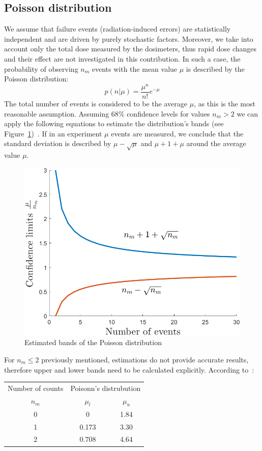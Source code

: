 \subsection{Poisson distribution}
We assume that failure events (radiation-induced errors) are statistically independent and are driven by purely stochastic factors. Moreover, we take into account only the total dose measured by the dosimeters, thus rapid dose changes and their effect are not investigated in this contribution. In such a case, the probability of observing $n_{m}$ events with the mean value $\mu$ is described by the Poisson distribution:\newline
\begin{equation}
    p(n|\mu) = \frac{\mu^{n}}{n!}e^{-\mu}
\end{equation}
The total number of events is considered to be the average $\mu$, as this is the most reasonable assumption.
Assuming 68\% confidence levels for values $n_{m} > 2$ we can apply the following equations to estimate the distribution's bands (see Figure~\ref{fig:poisson})~\cite{schmidt}.
If in an experiment $\mu$ events are measured, we conclude that the standard deviation is described by $\mu - \sqrt{\mu}$ and $\mu + 1 + \mu$ around the average value $\mu$.
\begin{figure}[!h]
    \centering
    \includegraphics[width=0.55\columnwidth]{Chapter4/images/poisson.png}
    \caption{Estimated bands of the Poisson distribution~\cite{schmidt}}
    \label{fig:poisson}
\end{figure}
For $n_{m} \leq 2$ previously mentioned, estimations do not provide accurate results, therefore upper and lower bands need to be calculated explicitly. According to~\cite{schmidt}:



\begin{table}[!h]
\centering
\begin{tabular}{ccc}
\hline
Number of counts & \multicolumn{2}{c}{Poisonn's distrubution} \\ \cline{2-3} 
$n_{m}$          & $\mu_{l}$            & $\mu_{u}$           \\ \hline
0                & 0                    & 1.84                \\
1                & 0.173                & 3.30                \\
2                & 0.708                & 4.64                \\ \hline
\end{tabular}

\end{table}
\newpage
